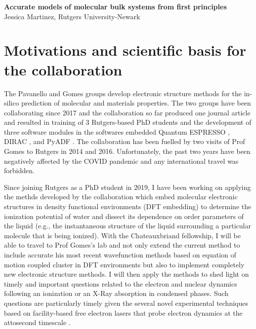\documentclass[notitlepage,12pt]{report}
\begin{document}
	\renewcommand\Affilfont{\itshape\small}
\begin{center}
    \textbf{\LARGE Accurate models of molecular bulk systems from first principles}\\
    Jessica Martinez, Rutgers University-Newark
\end{center}
\section{Motivations and scientific basis for the collaboration}

    The Pavanello and Gomes groups develop electronic structure methods for the in-silico prediction of molecular and materials properties. The two groups have been collaborating since 2017 and the collaboration so far produced one journal article \supercite{tolle2019charged} and resulted in training of 3 Rutgers-based PhD students and the development of three software modules in the softwares embedded Quantum ESPRESSO \supercite{}, DIRAC \supercite{}, and PyADF \supercite{}. The collaboration has been fuelled by two visits of Prof Gomes to Rutgers in 2014 and 2016. Unfortunately, the past two years have been negatively affected by the COVID pandemic and any international travel was forbidden. 

    Since joining Rutgers as a PhD student in 2019, I have been working on applying the methds developed by the collaboration which embed molecular  electronic structures in density functional environments (DFT embedding) to determine the ionization potential of water and dissect its dependence on order parameters of the liquid (e.g., the instantaneous structure of  the liquid surrounding a particular molecule that is being ionized).  With the Chateauxbriand fellowship, I will be able to travel to Prof Gomes's lab and not only extend the current method to include accurate his most recent wavefunction methods based on equation of motion coupled cluster in DFT environments but also to implement completely new electronic structure methods. I will then apply the methods to shed light on timely and important questions related to the electron and nuclear dynamics following an ionization or an X-Ray absorption in condensed phases. Such questions are particularly timely given the several novel experimental techniques based on facility-based free electron lasers that probe electron dynamics at the attosecond timescale \supercite{}.  
\end{document}
